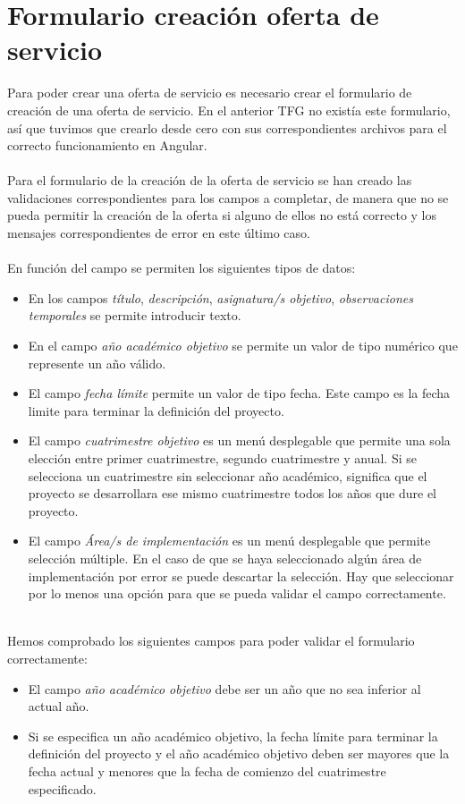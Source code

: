 \documentclass[11pt]{book}
\begin{document}
	\section{Formulario creación oferta de servicio}
	Para poder crear una oferta de servicio es necesario crear el formulario de creación de una oferta de servicio. En el anterior TFG no existía este formulario, así que tuvimos que crearlo desde cero con sus correspondientes archivos para el correcto funcionamiento en Angular.\\\\
	Para el formulario de la creación de la oferta de servicio se han creado las validaciones correspondientes para los campos a completar, de manera que no se pueda permitir la creación de la oferta si alguno de ellos no está correcto y los mensajes correspondientes de error en este último caso. \\\\
	En función del campo se permiten los siguientes tipos de datos: \\
	\begin{itemize} 
		\item En los campos \emph{título}, \emph{descripción}, \emph{asignatura/s objetivo}, \emph{observaciones temporales} se permite introducir texto.
		\item En el campo \emph{año académico objetivo} se permite un valor de tipo numérico que represente un año válido.
		\item El campo \emph{fecha límite} permite un valor de tipo fecha. Este campo es la fecha limite para terminar la definición del proyecto.
		\item  El campo \emph{cuatrimestre objetivo} es un menú desplegable que permite una sola elección entre primer cuatrimestre, segundo cuatrimestre y anual. Si se selecciona un cuatrimestre sin seleccionar año académico, significa que el proyecto se desarrollara ese mismo cuatrimestre todos los años que dure el proyecto.
		\item El campo \emph{Área/s de implementación} es un menú desplegable que permite selección múltiple. En el caso de que se haya seleccionado algún área de implementación por error se puede descartar la selección. Hay que seleccionar por lo menos una opción para que se pueda validar el campo correctamente.\\\\
	\end{itemize}
	Hemos comprobado los siguientes campos para poder validar el formulario correctamente:
	\begin{itemize} 
		\item	El campo \emph{año académico objetivo} debe ser un año que no sea inferior al actual año.
		\item	Si se especifica un año académico objetivo, la fecha límite para terminar la definición del proyecto y el año académico objetivo deben ser mayores que la fecha actual y menores que la fecha de comienzo del cuatrimestre especificado.\\\\
	\end{itemize}
\end{document}
